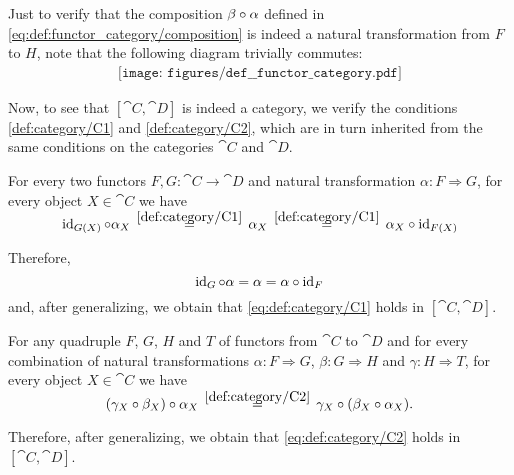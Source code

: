 \begin{defproof}
  Just to verify that the composition \( \beta \bincirc \alpha \) defined in \eqref{eq:def:functor_category/composition} is indeed a natural transformation from \( F \) to \( H \), note that the following diagram trivially commutes:
  \begin{equation}\label{eq:ex:quivers_as_functors/index/diagram}
    \begin{aligned}
      \texttt{[image: figures/def\_\_functor\_category.pdf]}
    \end{aligned}
  \end{equation}

  Now, to see that \( [\cat{C}, \cat{D}] \) is indeed a category, we verify the conditions \ref{def:category/C1} and \ref{def:category/C2}, which are in turn inherited from the same conditions on the categories \( \cat{C} \) and \( \cat{D} \).

   For every two functors \( F, G: \cat{C} \to \cat{D} \) and natural transformation \( \alpha: F \Rightarrow G \), for every object \( X \in \cat{C} \) we have
  \begin{equation*}
    \id_{G(X)} \bincirc \alpha_X
    \reloset{\eqref{def:category/C1}} =
    \alpha_X
    \reloset{\eqref{def:category/C1}} =
    \alpha_X \bincirc \id_{F(X)}
  \end{equation*}

  Therefore,
  \begin{equation*}
    \id_G \bincirc \alpha = \alpha = \alpha \bincirc \id_F
  \end{equation*}
  and, after generalizing, we obtain that \eqref{eq:def:category/C1} holds in \( [\cat{C}, \cat{D}] \).

   For any quadruple \( F \), \( G \), \( H \) and \( T \) of functors from \( \cat{C} \) to \( \cat{D} \) and for every combination of natural transformations \( \alpha: F \Rightarrow G \), \( \beta: G \Rightarrow H \) and \( \gamma: H \Rightarrow T \), for every object \( X \in \cat{C} \) we have
  \begin{equation*}
    (\gamma_X \bincirc \beta_X) \bincirc \alpha_X
    \reloset{\eqref{def:category/C2}} =
    \gamma_X \bincirc (\beta_X \bincirc \alpha_X).
  \end{equation*}

  Therefore, after generalizing, we obtain that \eqref{eq:def:category/C2} holds in \( [\cat{C}, \cat{D}] \).
\end{defproof}

